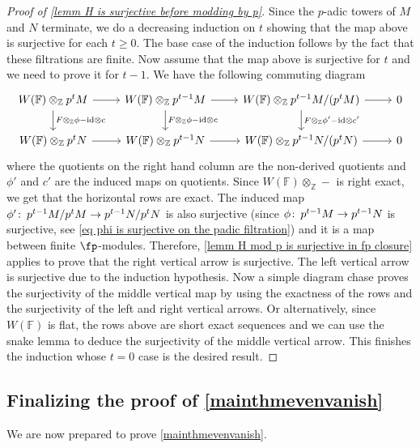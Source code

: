 \documentclass[english,10pt]{amsart}
\newcommand{\field}{\mathbb{F}}
\theoremstyle{definition}
\numberwithin{equation}{section}
\def\co{\colon\thinspace}
\begin{document}
\begin{proof}[Proof of \autoref{lemm H  is surjective before modding by p}]
Since the $p$-adic towers of $M$ and $N$ terminate, we do a decreasing induction on $t$ showing that the map above is surjective for each $t\geq 0$. The base case of the induction  follows by the fact that these filtrations are finite. Now assume that the map above is surjective for $t$ and we need to prove it for $t-1$. We have the following commuting diagram
\begin{equation*}
\begin{tikzcd}
W(\field) \otimes_{\mathbb{Z}}p^t M \ar[d,"F\otimes_{\mathbb{Z}} \phi - \textup{id} \otimes c"] \ar[r] & W(\field) \otimes_{\mathbb{Z}} p^{t-1} M \ar[r] \ar[d,"F \otimes_{\mathbb{Z}}\phi - \textup{id} \otimes c"]  & W(\field) \otimes_{\mathbb{Z}} p^{t-1}M /(p^{t} M) \ar[d,"F \otimes_{\mathbb{Z}} \phi' - \textup{id} \otimes c'"]\ar[r] & 0 \\
W(\field) \otimes_{\mathbb{Z}} p^t N\ar[r] &W(\field) \otimes_{\mathbb{Z}} p^{t-1} N \ar[r] & W(\field) \otimes_{\mathbb{Z}}  p^{t-1}N /(p^{t} N) \ar[r] & 0
\end{tikzcd}
\end{equation*}
where the quotients on the right hand column are the non-derived quotients and $\phi'$ and $c'$ are the induced maps on quotients. Since $W(\field)\otimes_{\mathbb{Z}}-$ is right exact, we get that the  horizontal rows are exact. The induced map $\phi' \co p^{t-1}M/p^tM \to p^{t-1}N/p^tN$ is also surjective (since $\phi \co p^{t-1}M \to p^{t-1}N$ is surjective, see \eqref{eq phi is surjective on the padic filtration}) and it is a map between finite $\fp$-modules. Therefore, \autoref{lemm H mod p is surjective in fp closure}  applies to prove that the right vertical arrow is surjective. The left vertical arrow is surjective due to the induction hypothesis. Now a simple diagram chase proves the surjectivity of the middle vertical map by using the exactness of the rows and the surjectivity of the left and  right  vertical arrows. Or alternatively, since $W(\field)$ is flat,  the rows above are short exact sequences and we can use the snake lemma to deduce the surjectivity of the middle vertical arrow. This finishes the induction whose $t=0$ case is  the desired result.
\end{proof}

\subsection{Finalizing the proof of \autoref{mainthmevenvanish}} 
We are now prepared to prove \autoref{mainthmevenvanish}.
\mainthmevenvanishing*
\end{document}
